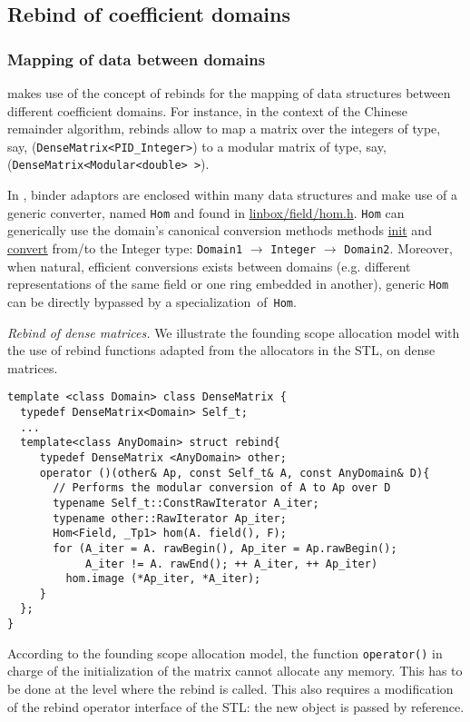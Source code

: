 \subsection{Rebind of coefficient domains}
\subsubsection{Mapping of data between domains}
\linbox makes use of the concept of rebinds for the mapping of data
structures between different coefficient domains.
For instance, in the context of the Chinese remainder algorithm, rebinds
allow to map a matrix over the integers of type, say,
(\texttt{DenseMatrix<PID\_Integer>}) to a modular matrix of type, say,
\\(\texttt{DenseMatrix<Modular<double> >}).

In \linbox, binder adaptors are enclosed
within many data structures and make use of a generic
converter, named \texttt{Hom} and found in \url{linbox/field/hom.h}.
\texttt{Hom} can generically use the \linbox domain's canonical
conversion methods methods \url{init} and \url{convert} from/to the \linbox
Integer type: \texttt{Domain1} $\rightarrow$ \texttt{Integer}
$\rightarrow$ \texttt{Domain2}. 
Moreover, when natural, efficient conversions exists between domains
(e.g. different representations of the same field or one ring embedded in another), generic \texttt{Hom} can be directly bypassed by a specialization~of~\texttt{Hom}.


\begin{paragraph}
{\em Rebind of dense matrices.}
We illustrate the founding scope allocation model with the use of rebind
functions adapted from the allocators in the STL, on dense matrices.
\begin{verbatim}
template <class Domain> class DenseMatrix {
  typedef DenseMatrix<Domain> Self_t;
  ... 
  template<class AnyDomain> struct rebind{ 
     typedef DenseMatrix <AnyDomain> other;
     operator ()(other& Ap, const Self_t& A, const AnyDomain& D){
       // Performs the modular conversion of A to Ap over D
       typename Self_t::ConstRawIterator A_iter;
       typename other::RawIterator Ap_iter;
       Hom<Field, _Tp1> hom(A. field(), F);
       for (A_iter = A. rawBegin(), Ap_iter = Ap.rawBegin();
            A_iter != A. rawEnd(); ++ A_iter, ++ Ap_iter)
         hom.image (*Ap_iter, *A_iter);
     } 
  };  
}
\end{verbatim}
According to the founding scope allocation model, the function
\texttt{operator()} in charge of the initialization of the matrix cannot 
allocate any memory. This has to be done at the level where the
rebind is called. This also requires a modification of the rebind
operator interface of the STL: the new object is passed by reference.

\end{paragraph}

